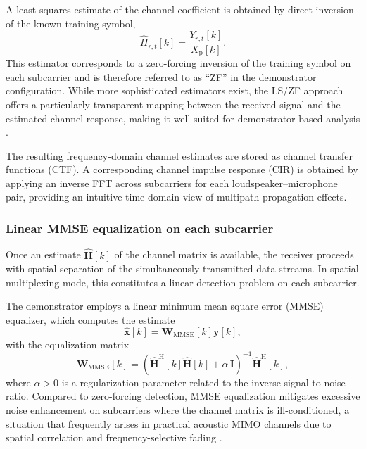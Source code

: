 A least-squares estimate of the channel coefficient is obtained by direct inversion of the known training symbol,
\begin{equation}
\hat{H}_{r,t}[k] = \frac{Y_{r,t}[k]}{X_{\mathrm{p}}[k]}.
\end{equation}
This estimator corresponds to a zero-forcing inversion of the training symbol on each subcarrier and is therefore referred to as ``ZF'' in the demonstrator configuration. While more sophisticated estimators exist, the LS/ZF approach offers a particularly transparent mapping between the received signal and the estimated channel response, making it well suited for demonstrator-based analysis \cite{proakis2008digital,tse2005fundamentals}.

The resulting frequency-domain channel estimates are stored as channel transfer functions (CTF). A corresponding channel impulse response (CIR) is obtained by applying an inverse FFT across subcarriers for each loudspeaker--microphone pair, providing an intuitive time-domain view of multipath propagation effects.

\subsubsection{Linear MMSE equalization on each subcarrier}

Once an estimate $\hat{\mathbf{H}}[k]$ of the channel matrix is available, the receiver proceeds with spatial separation of the simultaneously transmitted data streams. In spatial multiplexing mode, this constitutes a linear detection problem on each subcarrier.

The demonstrator employs a linear minimum mean square error (MMSE) equalizer, which computes the estimate
\begin{equation}
\hat{\mathbf{x}}[k] = \mathbf{W}_{\mathrm{MMSE}}[k]\mathbf{y}[k],
\end{equation}
with the equalization matrix
\begin{equation}
\mathbf{W}_{\mathrm{MMSE}}[k]
=
\left(
\hat{\mathbf{H}}^{\mathrm{H}}[k]\hat{\mathbf{H}}[k] + \alpha\,\mathbf{I}
\right)^{-1}
\hat{\mathbf{H}}^{\mathrm{H}}[k],
\end{equation}
where $\alpha>0$ is a regularization parameter related to the inverse signal-to-noise ratio. Compared to zero-forcing detection, MMSE equalization mitigates excessive noise enhancement on subcarriers where the channel matrix is ill-conditioned, a situation that frequently arises in practical acoustic MIMO channels due to spatial correlation and frequency-selective fading \cite{tse2005fundamentals}.

